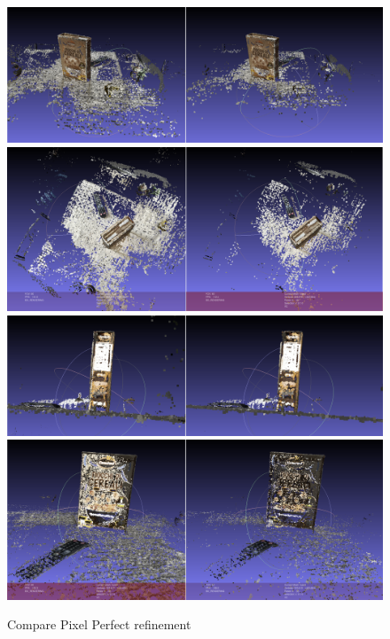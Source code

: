 \documentclass[11pt]{article}
\begin{document}
    \begin{figure}
    \caption{Compare Pixel Perfect refinement}
    \centering
    \includegraphics[width=\textwidth,height=\textheight,keepaspectratio]{images/cereal.1.png}
    \includegraphics[width=\textwidth,height=\textheight,keepaspectratio]{images/cereal.2.png}
    \includegraphics[width=\textwidth,height=\textheight,keepaspectratio]{images/cereal.3.png}
    \includegraphics[width=\textwidth,height=\textheight,keepaspectratio]{images/cereal.4.png}
    \label{fig:cereal}
    \end{figure}
\end{document}
